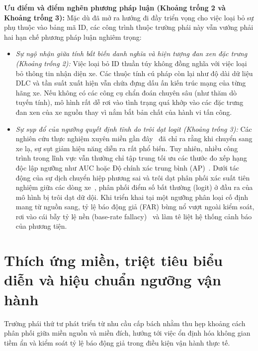 \documentclass[12pt, a4paper, reqno, oneside]{book}
\begin{document}
\textbf{Ưu điểm và điểm nghẽn phương pháp luận (Khoảng trống 2 và Khoảng trống 3):}
Mặc dù đã mở ra hướng đi đầy triển vọng cho việc loại bỏ sự phụ thuộc vào bảng mã ID, các công trình thuộc trường phái này vẫn vướng phải hai hạn chế phương pháp luận nghiêm trọng:
\begin{itemize}
    \item \textit{Sự ngộ nhận giữa tính bất biến danh nghĩa và hiện tượng đan xen đặc trưng (Khoảng trống 2):} Việc loại bỏ ID thuần túy không đồng nghĩa với việc loại bỏ thông tin nhận diện xe. Các thuộc tính cú pháp còn lại như độ dài dữ liệu DLC và tần suất xuất hiện vẫn chứa đựng dấu ấn kiến trúc mạng của từng hãng xe. Nếu không có các công cụ chẩn đoán chuyên sâu (như thăm dò tuyến tính), mô hình rất dễ rơi vào tình trạng quá khớp vào các đặc trưng đan xen của xe nguồn thay vì nắm bắt bản chất của hành vi tấn công.
    \item \textit{Sự sụp đổ của ngưỡng quyết định tĩnh do trôi dạt logit (Khoảng trống 3):} Các nghiên cứu thực nghiệm xuyên miền gần đây~\cite{koltai2026trust,sharmin2024benchmark,lampe2024curated} đã chỉ ra rằng khi chuyển sang xe lạ, sự sụt giảm hiệu năng diễn ra rất phổ biến. Tuy nhiên, nhiều công trình trong lĩnh vực vẫn thường chỉ tập trung tối ưu các thước đo xếp hạng độc lập ngưỡng như AUC hoặc Độ chính xác trung bình (AP)~\cite{saito2015pr}. Dưới tác động của sự dịch chuyển hiệp phương sai và trôi dạt phân phối xác suất tiên nghiệm giữa các dòng xe~\cite{shimodaira2000covariate,morenotorres2012shift}, phân phối điểm số bất thường (logit) ở đầu ra của mô hình bị trôi dạt dữ dội. Khi triển khai tại một ngưỡng phân loại cố định mang từ nguồn sang, tỷ lệ báo động giả (FAR) bùng nổ vượt ngoài kiểm soát, rơi vào cái bẫy tỷ lệ nền (base-rate fallacy)~\cite{axelsson2000base,sommer2010outside} và làm tê liệt hệ thống cảnh báo của phương tiện.
\end{itemize}

\section{Thích ứng miền, triệt tiêu biểu diễn và hiệu chuẩn ngưỡng vận hành}
Trường phái thứ tư phát triển từ nhu cầu cấp bách nhằm thu hẹp khoảng cách phân phối giữa miền nguồn và miền đích, hướng tới việc ổn định hóa không gian tiềm ẩn và kiểm soát tỷ lệ báo động giả trong điều kiện vận hành thực tế.
\end{document}
